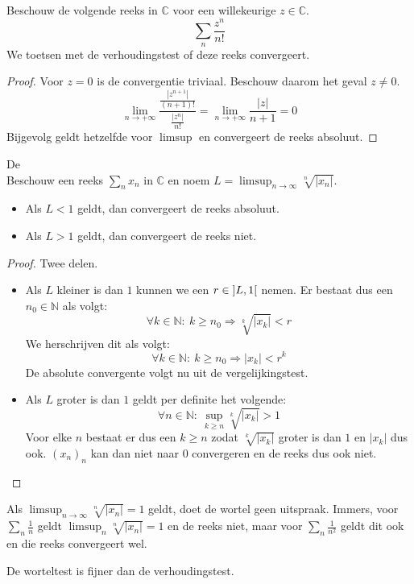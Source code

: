 \documentclass[main.tex]{subfiles}
\begin{document}
\begin{vb}
  Beschouw de volgende reeks in $\mathbb{C}$ voor een willekeurige $z\in \mathbb{C}$.
  \[ \sum_{n}\frac{z^{n}}{n!} \]
  We toetsen met de verhoudingstest of deze reeks convergeert.

  \begin{proof}
    Voor $z=0$ is de convergentie triviaal.
    Beschouw daarom het geval $z \neq 0$.
    \[ \lim_{n\rightarrow +\infty}\frac{\frac{|z^{n+1}|}{(n+1)!}}{\frac{|z^{n}|}{n!}} = \lim_{n \rightarrow +\infty }\frac{|z|}{n+1} = 0 \]
    Bijgevolg geldt hetzelfde voor $\limsup$  en convergeert de reeks absoluut.
  \end{proof}
\end{vb}

\begin{st}
  De \\
  Beschouw een reeks $\sum_{n}x_{n}$ in $\mathbb{C}$ en noem $L= \limsup_{n\rightarrow \infty}\sqrt[n]{|x_{n}|}$.
  \begin{itemize}
  \item Als $L<1$ geldt, dan convergeert de reeks absoluut.
  \item Als $L>1$ geldt, dan convergeert de reeks niet.
  \end{itemize}

  \begin{proof}
    Twee delen.
    \begin{itemize}
    \item Als $L$ kleiner is dan $1$ kunnen we een $r\in \interval[open]{L}{1}$ nemen.
      Er bestaat dus een $n_{0}\in \mathbb{N}$ als volgt:
      \[ \forall k\in \mathbb{N}:\ k \ge n_{0} \Rightarrow \sqrt[k]{|x_{k}|} < r \]
      We herschrijven dit als volgt:
      \[ \forall k\in \mathbb{N}:\ k \ge n_{0} \Rightarrow |x_{k}| < r^{k} \]
      De absolute convergente volgt nu uit de vergelijkingstest.
    \item Als $L$ groter is dan $1$ geldt per definite het volgende:
      \[ \forall n\in \mathbb{N}:\ \sup_{k\ge n}\sqrt[k]{|x_{k}|} > 1 \]
      Voor elke $n$ bestaat er dus een $k\ge n$ zodat $\sqrt[k]{|x_{k}|}$ groter is dan $1$ en $|x_{k}|$ dus ook.
      $(x_{n})_{n}$ kan dan niet naar $0$ convergeren en de reeks dus ook niet.
    \end{itemize}
  \end{proof}
\end{st}

\begin{opm}
  Als $\limsup_{n\rightarrow \infty}\sqrt[n]{|x_{n}|}= 1$ geldt, doet de wortel geen uitspraak.
  Immers, voor $\sum_{n}\frac{1}{n}$ geldt $\limsup_{n}\sqrt[n]{|x_{n}|} = 1$ en de reeks niet, maar voor $\sum_{n}\frac{1}{n^{2}}$ geldt dit ook en die reeks convergeert wel.
\end{opm}


\begin{st}
  De worteltest is fijner dan de verhoudingstest.
\end{st}
\end{document}
